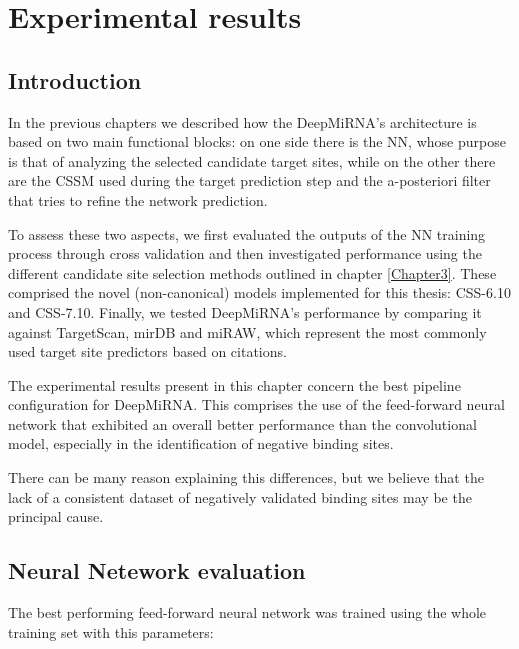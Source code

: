 
\chapter{Experimental results} %

\label{Chapter5} %

\section{Introduction}
In the previous chapters we described how the DeepMiRNA's architecture is based on two main functional blocks: on one side there is the NN, whose purpose is that of analyzing the selected candidate target sites, while on the other there are the CSSM used during the target prediction step and the a-posteriori filter that tries to refine the network prediction. 

To assess these two aspects, we first evaluated the outputs of the NN training process through cross validation and then investigated performance using the different candidate site selection methods outlined in chapter \ref{Chapter3}. These comprised the novel (non-canonical) models implemented for this thesis: CSS-6.10 and CSS-7.10. Finally, we tested DeepMiRNA’s performance by comparing it against TargetScan\cite{targetscan}, mirDB\cite{mirdb} and miRAW\cite{miraw}, which represent the most commonly used target site predictors based on citations.

The experimental results present in this chapter concern the best pipeline configuration for DeepMiRNA. This comprises the use of the feed-forward neural network that exhibited an overall better performance than the convolutional model, especially in the identification of negative binding sites. 

There can be many reason explaining this differences, but we believe that the lack of a consistent dataset of negatively validated binding sites may be the principal cause. 

\section{Neural Netework evaluation}
The best performing feed-forward neural network was trained using the whole training set with this parameters:

